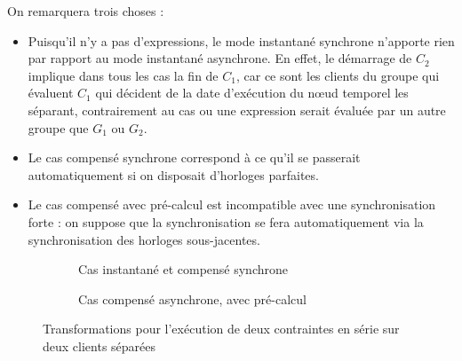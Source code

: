 \documentclass{article}
\begin{document}
On remarquera trois choses : 
\begin{itemize}
    \item Puisqu'il n'y a pas d'expressions, le mode instantané synchrone n'apporte rien par rapport au mode instantané asynchrone.
    En effet, le démarrage de $C_2$ implique dans tous les cas la fin de $C_1$, car ce sont les clients du groupe qui évaluent $C_1$ qui décident de la date d'exécution du nœud temporel les séparant, contrairement au cas ou une expression serait évaluée par un autre groupe que $G_1$ ou $G_2$.
    \item Le cas compensé synchrone correspond à ce qu'il se passerait automatiquement si on disposait d'horloges parfaites.
    \item Le cas compensé avec pré-calcul est incompatible avec une synchronisation forte : on suppose que la synchronisation se fera automatiquement via la synchronisation des horloges sous-jacentes.
\end{itemize}

\begin{figure}[h]
\centering
\begin{subfigure}{.5\linewidth}
\begin{tikzpicture}

\end{tikzpicture}
\caption{Cas instantané et compensé synchrone}
\label{depl.simple.async.instant}
\end{subfigure}

\begin{subfigure}{.5\linewidth}
    \begin{tikzpicture}
    
    \end{tikzpicture}
    \caption{Cas compensé asynchrone, avec pré-calcul}
    \label{depl.simple.sync.comp}
\end{subfigure}
\caption{Transformations pour l'exécution de deux contraintes en série sur deux clients séparées}
\label{scenar.deplacement}
\end{figure}




\end{document}
